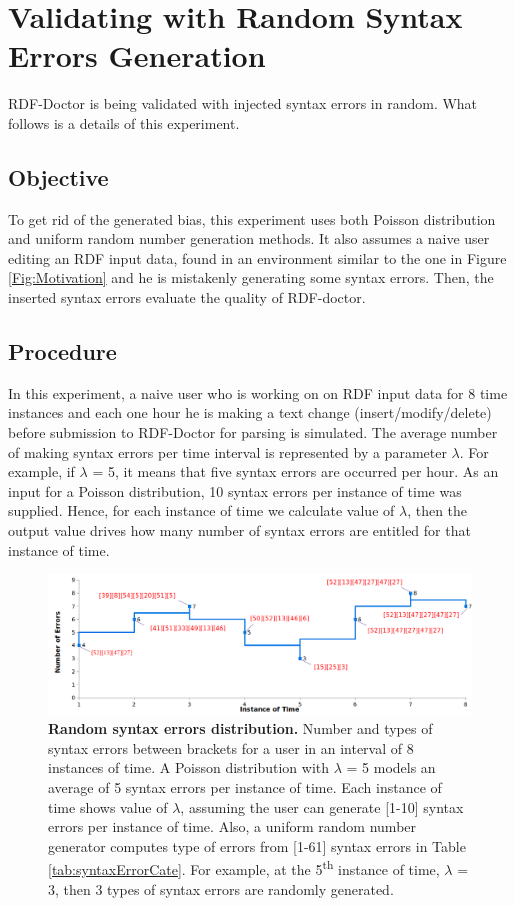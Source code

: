 \section{Validating with Random Syntax Errors Generation}
RDF-Doctor is being validated with injected syntax errors in random. What follows is a details of this experiment.
\subsection{Objective}
To get rid of the generated bias, this experiment uses both Poisson distribution and uniform random number generation methods. It also assumes a naive user editing an RDF input data, found in an environment similar to the one in Figure \ref{Fig:Motivation} and he is mistakenly generating some  syntax errors. Then, the inserted syntax errors evaluate the quality of RDF-doctor.


\subsection{Procedure}
 In this experiment, a naive user who is working on on RDF input data for 8 time instances and each one hour he is making a text change (insert/modify/delete) before submission to RDF-Doctor for parsing is simulated. The average number of making syntax errors per time interval is represented by a parameter $\lambda$. For example, if   $\lambda$ = 5, it means that five syntax errors are occurred per hour.  As an input for a Poisson distribution, 10 syntax errors per instance of time was supplied. Hence, for each instance of time we calculate value of $\lambda$, then the output value drives how many number of syntax errors are entitled for that instance of time.
 
 	\begin{figure}[ht]
	\begin{center}
		\includegraphics[scale=0.45,angle=0]{images/Experiment02-01.png}
		\setlength\belowcaptionskip{-5mm}
		\caption{\textbf{Random syntax errors distribution.} Number and types of syntax errors between brackets for a user in an interval of 8 instances of time. A Poisson  distribution with $\lambda$ = 5 models an average of 5 syntax errors per instance of time. Each instance of time shows value of $\lambda$, assuming the user can generate [1-10] syntax errors per instance of time. Also, a uniform random number generator computes type of errors from [1-61] syntax errors in Table \ref{tab:syntaxErrorCate}. For example, at the 5\textsuperscript{th} instance of time, $\lambda$ = 3, then 3 types of syntax errors are randomly generated.} 
		\label{Fig:experiment2}
	\end{center}
\end{figure}

